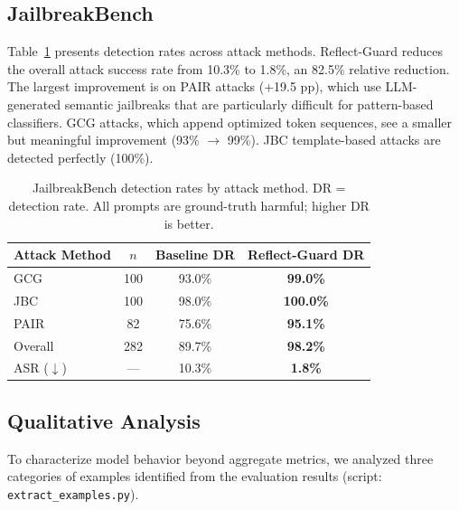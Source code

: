 \documentclass[ai,article,submit,pdftex,moreauthors]{Definitions/mdpi}
\begin{document}
\subsection{JailbreakBench}

Table~\ref{tab:jailbreakbench} presents detection rates across attack methods. Reflect-Guard reduces the overall attack success rate from 10.3\% to 1.8\%, an 82.5\% relative reduction. The largest improvement is on PAIR attacks (+19.5 pp), which use LLM-generated semantic jailbreaks that are particularly difficult for pattern-based classifiers. GCG attacks, which append optimized token sequences, see a smaller but meaningful improvement (93\% $\to$ 99\%). JBC template-based attacks are detected perfectly (100\%).

\begin{table}[H]
  \caption{JailbreakBench detection rates by attack method. DR = detection rate. All prompts are ground-truth harmful; higher DR is better.\label{tab:jailbreakbench}}
  \centering
  \begin{tabular}{lccc}
    \toprule
    Attack Method & $n$ & Baseline DR & Reflect-Guard DR \\
    \midrule
    GCG  & 100 & 93.0\%  & \textbf{99.0\%}  \\
    JBC  & 100 & 98.0\%  & \textbf{100.0\%} \\
    PAIR &  82 & 75.6\%  & \textbf{95.1\%}  \\
    \midrule
    Overall & 282 & 89.7\% & \textbf{98.2\%} \\
    \midrule
    ASR ($\downarrow$) & --- & 10.3\% & \textbf{1.8\%} \\
    \bottomrule
  \end{tabular}
\end{table}

\subsection{Qualitative Analysis}
\label{sec:qualitative}

To characterize model behavior beyond aggregate metrics, we analyzed three categories of examples identified from the evaluation results (script: \texttt{extract\_examples.py}).
\end{document}
